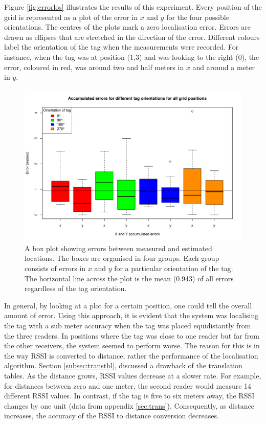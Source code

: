 Figure \ref{fig:errorlos} illustrates the results of this experiment. Every position of the grid is represented as a plot of the error in $x$ and $y$ for the four possible orientations. The centres of the plots mark a zero localisation error. Errors are drawn as ellipses that are stretched in the direction of the error. Different colours label the orientation of the tag when the measurements were recorded. For instance, when the tag was at position (1,3) and was looking to the right (0\textdegree), the error, coloured in red, was around two and half meters in $x$ and around a meter in $y$. 
\begin{figure}[H]
	\begin{center}
		\includegraphics[width=.8\textwidth]{figures/error_boxplot}
		\caption{A box plot showing errors between measured and estimated locations. The boxes are organised in four groups. Each group consists of errors in $x$ and $y$ for a particular orientation of the tag. The horizontal line across the plot is the mean (0.943) of all errors regardless of the tag orientation.}
		\label{fig:errorlosbox}
	\end{center}
\end{figure}

In general, by looking at a plot for a certain position, one could tell the overall amount of error. Using this approach, it is evident that the system was localising the tag with a sub meter accuracy when the tag was placed equidistantly from the three readers. In positions where the tag was close to one reader but far from the other receivers, the system seemed to perform worse. The reason for this is in the way RSSI is converted to distance, rather the performance of the localisation algorithm. Section \ref{subsec:transtbl}, discussed a drawback of the translation tables. As the distance grows, RSSI values decrease at a slower rate. For example, for distances between zero and one meter, the second reader would measure 14 different RSSI values. In contrast, if the tag is five to six meters away, the RSSI changes by one unit (data from appendix \ref{sec:trans}). Consequently, as distance increases, the accuracy of the RSSI to distance conversion decreases.

